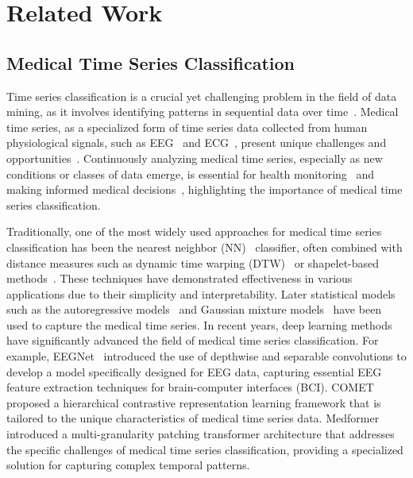 \vspace{-2mm}
\section{Related Work}

\subsection{Medical Time Series Classification}
Time series classification is a crucial yet challenging problem in the field of data mining, as it involves identifying patterns in sequential data over time~\cite{tsc_survey_2019}. 
Medical time series, as a specialized form of time series data collected from human physiological signals, such as EEG~\cite{YangW023} and ECG~\cite{KiyassehZC21}, present unique challenges and opportunities~\cite{JafariSKBSLGA23}. Continuously analyzing medical time series, especially as new conditions or classes of data emerge, is essential for health monitoring~\cite{WangSY23} and making informed medical decisions~\cite{AdmassB24}, highlighting the importance of medical time series classification.

Traditionally, one of the most widely used approaches for medical time series classification has been the nearest neighbor (NN)~\cite{LinesB15} classifier, often combined with distance measures such as dynamic time warping (DTW)~\cite{BagnallLBLK17} or shapelet-based methods~\cite{BostromB17}. These techniques have demonstrated effectiveness in various applications due to their simplicity and interpretability. Later statistical models such as the autoregressive models~\cite{schaffer2021interrupted} and Gaussian mixture models~\cite{vincent2010spatially} have been used to capture the medical time series.
In recent years, deep learning methods have significantly advanced the field of medical time series classification. For example, EEGNet~\cite{eegnet_2016} introduced the use of depthwise and separable convolutions to develop a model specifically designed for EEG data, capturing essential EEG feature extraction techniques for brain-computer interfaces (BCI). COMET~\cite{comet_2023} proposed a hierarchical contrastive representation learning framework that is tailored to the unique characteristics of medical time series data. Medformer~\cite{medformer_2024} introduced a multi-granularity patching transformer architecture that addresses the specific challenges of medical time series classification, providing a specialized solution for capturing complex temporal patterns.


